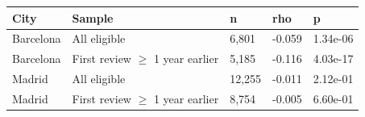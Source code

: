 \begin{tabular}{lllll}
\toprule
City & Sample & n & rho & p \\
\midrule
Barcelona & All eligible & 6,801 & -0.059 & 1.34e-06 \\
Barcelona & First review $\geq$ 1 year earlier & 5,185 & -0.116 & 4.03e-17 \\
Madrid & All eligible & 12,255 & -0.011 & 2.12e-01 \\
Madrid & First review $\geq$ 1 year earlier & 8,754 & -0.005 & 6.60e-01 \\
\bottomrule
\end{tabular}
